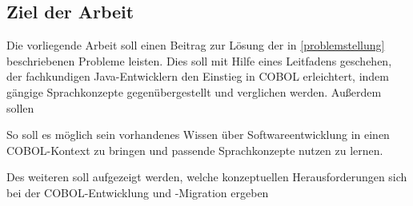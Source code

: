 \subsection{Ziel der Arbeit}

Die vorliegende Arbeit soll einen Beitrag zur Lösung der in \autoref{problemstellung} beschriebenen Probleme leisten. Dies soll mit Hilfe eines Leitfadens geschehen, der fachkundigen Java-Entwicklern den Einstieg in COBOL erleichtert, indem gängige Sprachkonzepte gegenübergestellt und verglichen werden. Außerdem sollen 

So soll es möglich sein vorhandenes Wissen über Softwareentwicklung in einen COBOL-Kontext zu bringen und passende Sprachkonzepte nutzen zu lernen. 

Des weiteren soll aufgezeigt werden, welche konzeptuellen Herausforderungen sich bei der COBOL-Entwicklung und -Migration ergeben